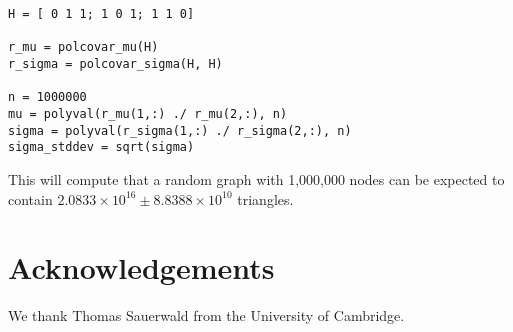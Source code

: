 \documentclass{article}
\begin{document}
\begin{verbatim}
H = [ 0 1 1; 1 0 1; 1 1 0]

r_mu = polcovar_mu(H)
r_sigma = polcovar_sigma(H, H)

n = 1000000
mu = polyval(r_mu(1,:) ./ r_mu(2,:), n)
sigma = polyval(r_sigma(1,:) ./ r_sigma(2,:), n)
sigma_stddev = sqrt(sigma)
\end{verbatim}
This will compute that a random graph with 1,000,000 nodes can be
expected to contain $2.0833 \times 10^{16} \pm 8.8388\times 10^{10}$
triangles.   

\section*{Acknowledgements}
We thank Thomas Sauerwald from the University of Cambridge. 



\end{document}
